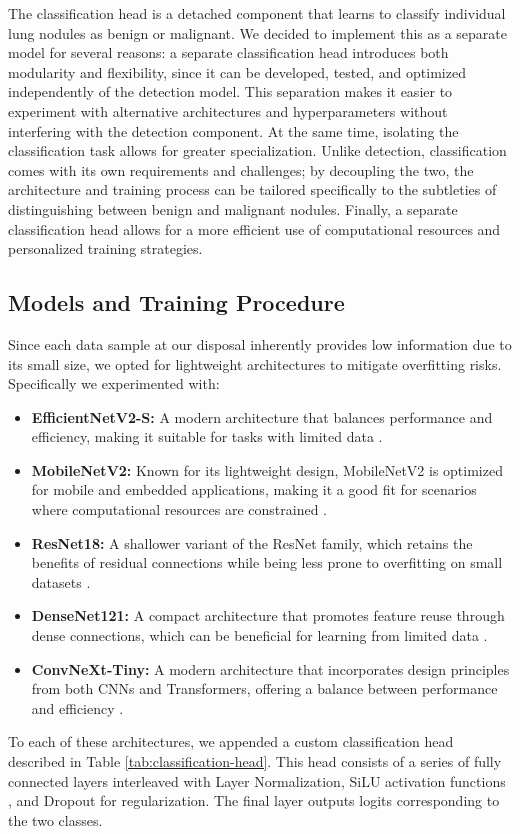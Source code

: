 The classification head is a detached component that learns to classify individual lung nodules as benign or malignant.
We decided to implement this as a separate model for several reasons:
a separate classification head introduces both modularity and flexibility, since it can be developed, tested, and optimized independently of the detection model. This separation makes it easier to experiment with alternative architectures and hyperparameters without interfering with the detection component. At the same time, isolating the classification task allows for greater specialization. Unlike detection, classification comes with its own requirements and challenges; by decoupling the two, the architecture and training process can be tailored specifically to the subtleties of distinguishing between benign and malignant nodules.
Finally, a separate classification head allows for a more efficient use of computational resources and personalized training strategies.
\subsection{Models and Training Procedure}
Since each data sample at our disposal inherently provides low information due to its small size, we opted for lightweight architectures to mitigate overfitting risks.
Specifically we experimented with:
\begin{itemize}
    \item \textbf{EfficientNetV2-S:} A modern architecture that balances performance and efficiency, making it suitable for tasks with limited data \cite{tan2020efficientnet}.
    \item \textbf{MobileNetV2:} Known for its lightweight design, MobileNetV2 is optimized for mobile and embedded applications, making it a good fit for scenarios where computational resources are constrained \cite{sandler2019mobilenetv2}.
    \item \textbf{ResNet18:} A shallower variant of the ResNet family, which retains the benefits of residual connections while being less prone to overfitting on small datasets \cite{he2015resnet}.
    \item \textbf{DenseNet121:} A compact architecture that promotes feature reuse through dense connections, which can be beneficial for learning from limited data \cite{huang2018densenet121}.
    \item \textbf{ConvNeXt-Tiny:} A modern architecture that incorporates design principles from both CNNs and Transformers, offering a balance between performance and efficiency \cite{liu2022convnext}.
\end{itemize}
To each of these architectures, we appended a custom classification head described in Table \ref{tab:classification-head}. This head consists of a series of fully connected layers interleaved with Layer Normalization, SiLU activation functions \cite{elfwing2017silu}, and Dropout for regularization. The final layer outputs logits corresponding to the two classes.


